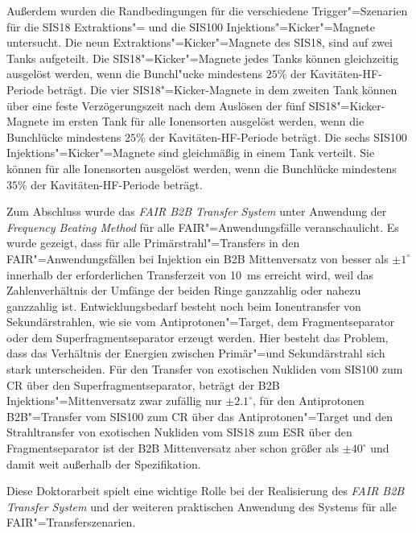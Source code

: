 Au\ss{}erdem wurden die Randbedingungen f\"ur die verschiedene Trigger"=Szenarien f\"ur die SIS18 Extraktions"= und die SIS100 Injektions"=Kicker"=Magnete untersucht. Die neun Extraktions"=Kicker"=Magnete des SIS18, sind auf zwei Tanks aufgeteilt. Die SIS18"=Kicker"=Magnete jedes Tanks k\"onnen gleichzeitig ausgelöst werden, wenn die Bunchl"ucke mindestens $25\%$ der Kavit\"aten-HF-Periode beträgt. Die vier SIS18"=Kicker-Magnete in dem zweiten Tank k\"onnen \"uber eine feste Verz\"ogerungszeit nach dem Ausl\"osen der f\"unf SIS18"=Kicker-Magnete im ersten Tank f\"ur alle Ionensorten ausgel\"ost werden, wenn die Bunchl\"ucke mindestens $25\%$ der Kavit\"aten-HF-Periode betr\"agt. Die sechs SIS100 Injektions"=Kicker"=Magnete sind gleichm\"a\ss{}ig in einem Tank verteilt. Sie k\"onnen f\"ur alle Ionensorten ausgel\"ost werden, wenn die Bunchl\"ucke mindestens $35\%$ der Kavitäten-HF-Periode betr\"agt.  

Zum Abschluss wurde das \textit{FAIR B2B Transfer System} unter Anwendung der \textit{Frequency Beating Method} f\"ur alle FAIR"=Anwendungsf\"alle veranschaulicht. Es wurde gezeigt, dass f\"ur alle Prim\"arstrahl"=Transfers in den FAIR"=Anwendungsf\"allen bei Injektion ein B2B Mittenversatz von besser als $\pm1^\circ$ innerhalb der erforderlichen Transferzeit von \SI{10}{\ms} erreicht wird, weil das Zahlenverh\"altnis der Umf\"ange der beiden Ringe ganzzahlig oder nahezu ganzzahlig ist.  Entwicklungsbedarf besteht noch beim Ionentransfer von Sekund\"arstrahlen, wie sie vom Antiprotonen"=Target, dem Fragmentseparator oder dem Superfragmentseparator erzeugt werden. Hier besteht das Problem, dass das Verh\"altnis der Energien zwischen Prim\"ar"=und Sekund\"arstrahl sich stark unterscheiden. F\"ur den Transfer von exotischen Nukliden vom SIS100 zum CR \"uber den Superfragmentseparator, betr\"agt der B2B Injektions"=Mittenversatz zwar zufällig nur $\pm2.1^\circ$, f\"ur den Antiprotonen B2B"=Transfer vom SIS100 zum CR \"uber das Antiprotonen"=Target und den Strahltransfer von exotischen Nukliden vom SIS18 zum ESR \"uber den Fragmentseparator ist der B2B Mittenversatz aber schon gr\"o\ss{}er als $\pm40^\circ$ und damit weit au\ss{}erhalb der Spezifikation.

Diese Doktorarbeit spielt eine wichtige Rolle bei der Realisierung des \textit{FAIR B2B Transfer System} und der weiteren praktischen Anwendung des Systems f\"ur alle FAIR"=Transferszenarien.
